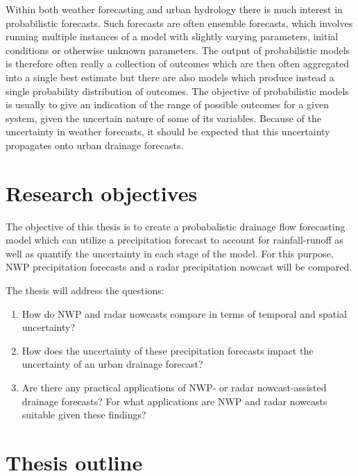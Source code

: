 Within both weather forecasting and urban hydrology there is much interest in probabilistic forecasts. Such forecasts are often ensemble forecasts, which involves running multiple instances of a model with slightly varying parameters, initial conditions or otherwise unknown parameters. The output of probabilistic models is therefore often really a collection of outcomes which are then often aggregated into a single best estimate but there are also models which produce instead a single probability distribution of outcomes. The objective of probabilistic models is usually to give an indication of the range of possible outcomes for a given system, given the uncertain nature of some of its variables. Because of the uncertainty in weather forecasts, it should be expected that this uncertainty propagates onto urban drainage forecasts. 


\section{Research objectives}
The objective of this thesis is to create a probabalistic drainage flow forecasting model which can utilize a precipitation forecast to account for rainfall-runoff as well as quantify the uncertainty in each stage of the model. For this purpose, NWP precipitation forecasts and a radar precipitation nowcast will be compared. 



The thesis will address the questions:

\begin{enumerate}
  \item How do NWP and radar nowcasts compare in terms of temporal and spatial uncertainty?
  \item How does the uncertainty of these precipitation forecasts impact the uncertainty of an urban drainage forecast?
  \item Are there any practical applications of NWP- or radar nowcast-assisted drainage forecasts? 
  For what applications are NWP and radar nowcasts suitable given these findings?
\end{enumerate}



\section{Thesis outline}


